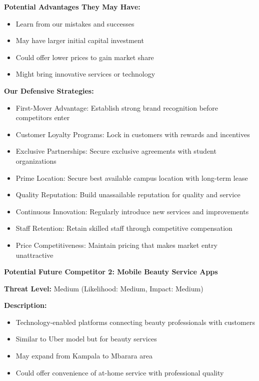 \textbf{Potential Advantages They May Have:}
\begin{itemize}[leftmargin=2em]
    \item Learn from our mistakes and successes
    \item May have larger initial capital investment
    \item Could offer lower prices to gain market share
    \item Might bring innovative services or technology
\end{itemize}

\textbf{Our Defensive Strategies:}
\begin{itemize}[leftmargin=2em]
    \item First-Mover Advantage: Establish strong brand recognition before competitors enter
    \item Customer Loyalty Programs: Lock in customers with rewards and incentives
    \item Exclusive Partnerships: Secure exclusive agreements with student organizations
    \item Prime Location: Secure best available campus location with long-term lease
    \item Quality Reputation: Build unassailable reputation for quality and service
    \item Continuous Innovation: Regularly introduce new services and improvements
    \item Staff Retention: Retain skilled staff through competitive compensation
    \item Price Competitiveness: Maintain pricing that makes market entry unattractive
\end{itemize}

\vspace{1em}

\textbf{Potential Future Competitor 2: Mobile Beauty Service Apps}

\textbf{Threat Level:} Medium (Likelihood: Medium, Impact: Medium)

\textbf{Description:}
\begin{itemize}[leftmargin=2em]
    \item Technology-enabled platforms connecting beauty professionals with customers
    \item Similar to Uber model but for beauty services
    \item May expand from Kampala to Mbarara area
    \item Could offer convenience of at-home service with professional quality
\end{itemize}

